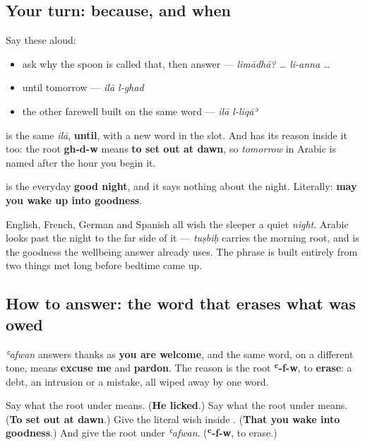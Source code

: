 \subsection*{Your turn: because, and when}
Say these aloud:

\begin{itemize}
\raggedright
  \item ask why the spoon is called that, then answer — \emph{limādhā? … li-anna …}
  \item until tomorrow — \emph{ilā l-ghad}
  \item the other farewell built on the same word — \emph{ilā l-liqāʾ}
\end{itemize}

\textbf{ } is the same \emph{ilā}, \textbf{until}, with a new word in the slot. And \textbf{} has its reason inside it too: the root \textbf{gh-d-w} means \textbf{to set out at dawn}, so \emph{tomorrow} in Arabic is named after the hour you begin it.

\begin{culture}
\textbf{  } is the everyday \textbf{good night}, and it says nothing about the night. Literally: \textbf{may you wake up into goodness}.

English, French, German and Spanish all wish the sleeper a quiet \emph{night}. Arabic looks past the night to the far side of it — \emph{tuṣbiḥ} carries the morning root, and \textbf{} is the goodness the wellbeing answer already uses. The phrase is built entirely from two things met long before bedtime came up.
\end{culture}

\subsection*{How to answer: the word that erases what was owed}
\emph{ʿafwan} answers thanks as \textbf{you are welcome}, and the same word, on a different tone, means \textbf{excuse me} and \textbf{pardon}. The reason is the root \textbf{ʿ-f-w}, to \textbf{erase}: a debt, an intrusion or a mistake, all wiped away by one word.

\begin{tcolorbox}[breakable,colback=teal!4,colframe=teal!35!black,title={Before you move on}]
Say what the root under \textbf{} means. (\textbf{He licked}.) Say what the root under \textbf{} means. (\textbf{To set out at dawn}.) Give the literal wish inside \textbf{  }. (\textbf{That you wake into goodness}.) And give the root under \emph{ʿafwan}. (\textbf{ʿ-f-w}, to erase.)
\end{tcolorbox}
